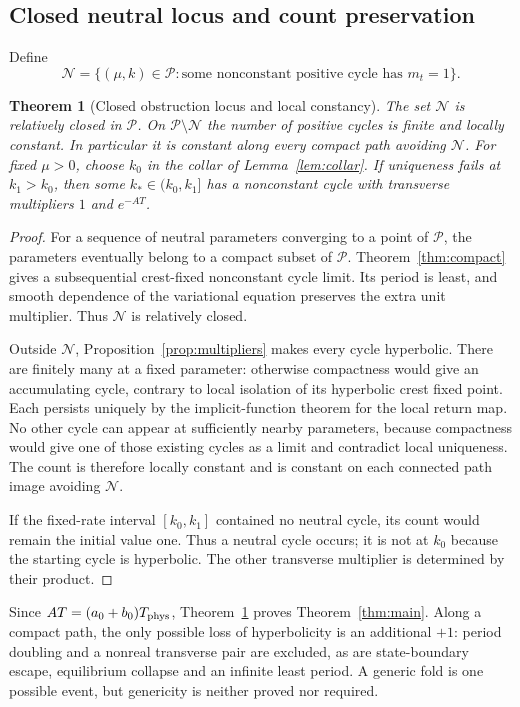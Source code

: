\documentclass[11pt,a4paper]{article}
\numberwithin{equation}{section}
\newtheorem{theorem}{Theorem}[section]
\theoremstyle{remark}\newtheorem{remark}[theorem]{Remark}
\newcommand{\cP}{\mathcal P}
\newcommand{\cN}{\mathcal N}
\begin{document}
\subsection{Closed neutral locus and count preservation}
Define
\begin{equation}\label{eq:neutralset}
\cN=\{(\mu,k)\in\cP:\text{some nonconstant positive cycle has }m_t=1\}.
\end{equation}
\begin{theorem}[Closed obstruction locus and local constancy]\label{thm:neutral}
The set $\cN$ is relatively closed in $\cP$. On $\cP\setminus\cN$ the number of positive cycles is finite and locally constant. In particular it is constant along every compact path avoiding $\cN$.
For fixed $\mu>0$, choose $k_0$ in the collar of Lemma~\ref{lem:collar}. If uniqueness fails at $k_1>k_0$, then some $k_*\in(k_0,k_1]$ has a nonconstant cycle with transverse multipliers $1$ and $e^{-AT}$.
\end{theorem}
\begin{proof}
For a sequence of neutral parameters converging to a point of $\cP$, the parameters eventually belong to a compact subset of $\cP$. Theorem~\ref{thm:compact} gives a subsequential crest-fixed nonconstant cycle limit. Its period is least, and smooth dependence of the variational equation preserves the extra unit multiplier. Thus $\cN$ is relatively closed.

Outside $\cN$, Proposition~\ref{prop:multipliers} makes every cycle hyperbolic. There are finitely many at a fixed parameter: otherwise compactness would give an accumulating cycle, contrary to local isolation of its hyperbolic crest fixed point. Each persists uniquely by the implicit-function theorem for the local return map. No other cycle can appear at sufficiently nearby parameters, because compactness would give one of those existing cycles as a limit and contradict local uniqueness. The count is therefore locally constant and is constant on each connected path image avoiding $\cN$.

If the fixed-rate interval $[k_0,k_1]$ contained no neutral cycle, its count would remain the initial value one. Thus a neutral cycle occurs; it is not at $k_0$ because the starting cycle is hyperbolic. The other transverse multiplier is determined by their product.
\end{proof}
Since $AT=(a_0+b_0)T_{\rm phys}$, Theorem~\ref{thm:neutral} proves Theorem~\ref{thm:main}. Along a compact path, the only possible loss of hyperbolicity is an additional $+1$: period doubling and a nonreal transverse pair are excluded, as are state-boundary escape, equilibrium collapse and an infinite least period. A generic fold is one possible event, but genericity is neither proved nor required.
\end{document}

